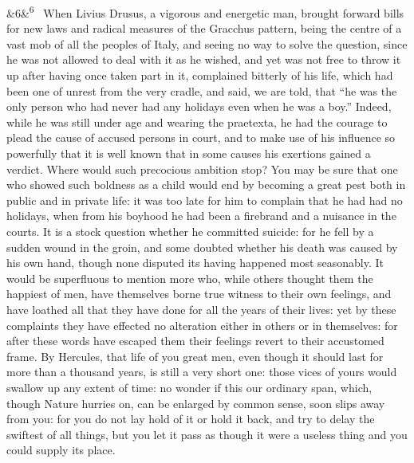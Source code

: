 \documentclass[12pt]{article}
\newcommand{\para}[1][]{\par\noindent\ifx&#1&\else\textsuperscript{\footnotesize #1}~\fi}
\begin{document}
\para[6] When Livius Drusus, a vigorous and energetic man, brought forward bills for new laws and radical measures of the Gracchus pattern, being the centre of a vast mob of all the peoples of Italy, and seeing no way to solve the question, since he was not allowed to deal with it as he wished, and yet was not free to throw it up after having once taken part in it, complained bitterly of his life, which had been one of unrest from the very cradle, and said, we are told, that “he was the only person who had never had any holidays even when he was a boy.” Indeed, while he was still under age and wearing the praetexta, he had the courage to plead the cause of accused persons in court, and to make use of his influence so powerfully that it is well known that in some causes his exertions gained a verdict. Where would such precocious ambition stop? You may be sure that one who showed such boldness as a child would end by becoming a great pest both in public and in private life: it was too late for him to complain that he had had no holidays, when from his boyhood he had been a firebrand and a nuisance in the courts. It is a stock question whether he committed suicide: for he fell by a sudden wound in the groin, and some doubted whether his death was caused by his own hand, though none disputed its having happened most seasonably. It would be superfluous to mention more who, while others thought them the happiest of men, have themselves borne true witness to their own feelings, and have loathed all that they have done for all the years of their lives: yet by these complaints they have effected no alteration either in others or in themselves: for after these words have escaped them their feelings revert to their accustomed frame. By Hercules, that life of you great men, even though it should last for more than a thousand years, is still a very short one: those vices of yours would swallow up any extent of time: no wonder if this our ordinary span, which, though Nature hurries on, can be enlarged by common sense, soon slips away from you: for you do not lay hold of it or hold it back, and try to delay the swiftest of all things, but you let it pass as though it were a useless thing and you could supply its place.
\end{document}
